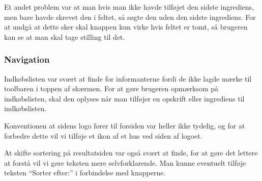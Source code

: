 Et andet problem var at man hvis man ikke havde tilføjet den sidste ingrediens, men bare havde skrevet den i feltet, så søgte den uden den sidste ingrediens. 
For at undgå at dette sker skal knappen kun virke hvis feltet er tomt, så brugeren kan se at man skal tage stilling til det.

\subsubsection{Navigation}
Indkøbslisten var svært at finde for informanterne fordi de ikke lagde mærke til toolbaren i toppen af skærmen. 
For at gøre brugeren opmærksom på indkøbslisten, skal den oplyses når man tilføjer en opskrift eller ingrediens til indkøbslisten.

Konventionen at sidens logo fører til forsiden var heller ikke tydelig, og for at forbedre dette vil vi tilføje et ikon af et hus ved siden af logoet.

At skifte sortering på resultatsiden var også svært at finde, for at gøre det lettere at forstå vil vi gøre teksten mere selvforklarende. Man kunne eventuelt tilføje teksten ``Sorter efter:'' i forbindelse med knapperne.